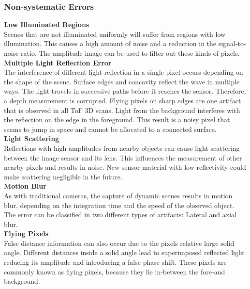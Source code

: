 \subsubsection{Non-systematic Errors}

\textbf{Low Illuminated Regions}\\
Scenes that are not illuminated uniformly will suffer from regions with low illumination. This causes a high amount of noise and a reduction in the signal-to-noise ratio. The amplitude image can be used to filter out these kinds of pixels.\\

\textbf{Multiple Light Reflection Error}\\
The interference of different light reflection in a single pixel occurs depending on the shape of the scene. Surface edges and concavity reflect the wave in multiple ways. The light travels in successive paths before it reaches the sensor. Therefore, a depth measurement is corrupted. Flying pixels on sharp edges are one artifact that is observed in all ToF 3D scans. Light from the background interferes with the reflection on the edge in the foreground. This result is a noisy pixel that seams to jump in space and cannot be allocated to a connected surface.\\

\textbf{Light Scattering}\\
Reflections with high amplitudes from nearby objects can cause light scattering between the image sensor and its lens. This influences the measurement of other nearby pixels and results in noise. New sensor material with low reflectivity could make scattering negligible in the future.\\

\textbf{Motion Blur}\\
As with traditional cameras, the capture of dynamic scenes results in motion blur, depending on the integration time and the speed of the observed object. The error can be classified in two different types of artifacts: Lateral and axial blur.\\

\textbf{Flying Pixels}\\
False distance information can also occur due to the pixels relative large solid angle. Different distances inside a solid angle lead to superimposed reflected light reducing its amplitude and introducing a false phase shift. These pixels are commonly known as flying pixels, because they lie in-between the fore-and background. 


